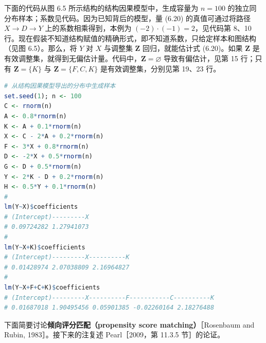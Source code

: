 \par\noindent\begin{minipage}{\linewidth}
\begin{codesnippet}
下面的代码从图 6.5 所示结构的结构因果模型中，生成容量为 $n=100$ 的独立同分布样本；系数见代码。因为已知背后的模型，量 (6.20) 的真值可通过将路径 $X\to D\to Y$ 上的系数相乘得到，本例为 $(-2)\cdot(-1)=2$，见代码第 8、10 行。现在假装不知道结构赋值的精确形式，即不知道系数，只给定样本和图结构（见图 6.5）。那么，将 $Y$ 对 $X$ 与调整集 $\mathbf Z$ 回归，就能估计式 (6.20)。如果 $\mathbf Z$ 是有效调整集，就得到无偏估计量。代码中，$\mathbf Z=\varnothing$ 导致有偏估计，见第 15 行；只有 $\mathbf Z=\{K\}$ 与 $\mathbf Z=\{F,C,K\}$ 是有效调整集，分别见第 19、23 行。
\begin{lstlisting}[language=R]
# 从结构因果模型导出的分布中生成样本
set.seed(1); n <- 100
C <- rnorm(n)
A <- 0.8*rnorm(n)
K <- A + 0.1*rnorm(n)
X <- C - 2*A + 0.2*rnorm(n)
F <- 3*X + 0.8*rnorm(n)
D <- -2*X + 0.5*rnorm(n)
G <- D + 0.5*rnorm(n)
Y <- 2*K - D + 0.2*rnorm(n)
H <- 0.5*Y + 0.1*rnorm(n)
#
lm(Y~X)$coefficients
# (Intercept)---------X
# 0.09724282 1.27941073
#
lm(Y~X+K)$coefficients
# (Intercept)---------X----------K
# 0.01428974 2.07038809 2.16964827
#
lm(Y~X+F+C+K)$coefficients
# (Intercept)---------X----------F-----------C----------K
# 0.01687018 1.90495456 0.05901385 -0.02260164 2.18276488
\end{lstlisting}
\end{codesnippet}
\end{minipage}\par

下面简要讨论\textbf{倾向评分匹配（propensity score matching）}［Rosenbaum and Rubin, 1983］。接下来的注复述 Pearl［2009，第 11.3.5 节］的论证。

